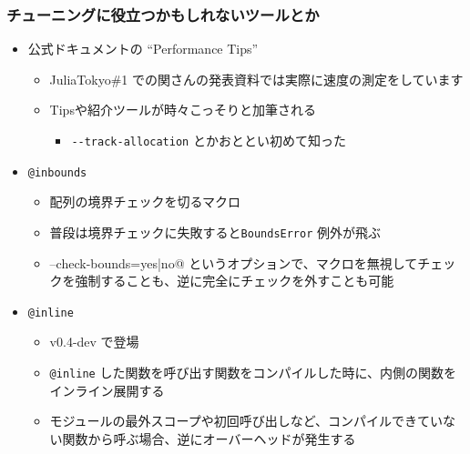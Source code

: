  \begin{frame}[containsverbatim]
 \frametitle{チューニングに役立つかもしれないツールとか}
 \begin{itemize}
   \item 公式ドキュメントの ``Performance Tips''
     \begin{itemize}
       \item JuliaTokyo\#1 での関さんの発表資料では実際に速度の測定をしています
       \item Tipsや紹介ツールが時々こっそりと加筆される
         \begin{itemize}
           \item \verb|--track-allocation| とかおととい初めて知った
         \end{itemize}
     \end{itemize}
   \item \verb|@inbounds|
     \begin{itemize}
       \item 配列の境界チェックを切るマクロ
       \item 普段は境界チェックに失敗すると\verb|BoundsError| 例外が飛ぶ
       \item \verb@--check-bounds={yes|no}@ というオプションで、マクロを無視してチェックを強制することも、逆に完全にチェックを外すことも可能
     \end{itemize}
   \item \verb|@inline|
     \begin{itemize}
       \item v0.4-dev で登場
       \item \verb|@inline| した関数を呼び出す関数をコンパイルした時に、内側の関数をインライン展開する
       \item モジュールの最外スコープや初回呼び出しなど、コンパイルできていない関数から呼ぶ場合、逆にオーバーヘッドが発生する
     \end{itemize}
 \end{itemize}
 \end{frame}


